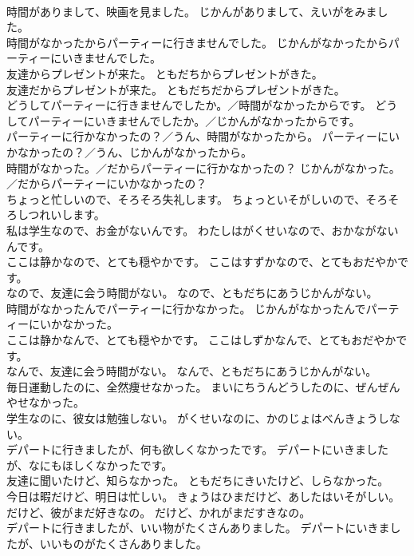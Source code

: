 \documentclass[8pt]{extreport}
\begin{document}
\begin{CJK}{UTF8}{min}
\\	時間がありまして、映画を見ました。	じかんがありまして、えいがをみました。 
\\	時間がなかったからパーティーに行きませんでした。	じかんがなかったからパーティーにいきませんでした。 
\\	友達からプレゼントが来た。	ともだちからプレゼントがきた。 
\\	友達だからプレゼントが来た。	ともだちだからプレゼントがきた。 
\\	どうしてパーティーに行きませんでしたか。／時間がなかったからです。	どうしてパーティーにいきませんでしたか。／じかんがなかったからです。 
\\	パーティーに行かなかったの？／うん、時間がなかったから。	パーティーにいかなかったの？／うん、じかんがなかったから。 
\\	時間がなかった。／だからパーティーに行かなかったの？	じかんがなかった。／だからパーティーにいかなかったの？ 
\\	ちょっと忙しいので、そろそろ失礼します。	ちょっといそがしいので、そろそろしつれいします。 
\\	私は学生なので、お金がないんです。	わたしはがくせいなので、おかながないんです。 
\\	ここは静かなので、とても穏やかです。	ここはすずかなので、とてもおだやかです。 
\\	なので、友達に会う時間がない。	なので、ともだちにあうじかんがない。 
\\	時間がなかったんでパーティーに行かなかった。	じかんがなかったんでパーティーにいかなかった。 
\\	ここは静かなんで、とても穏やかです。	ここはしずかなんで、とてもおだやかです。 
\\	なんで、友達に会う時間がない。	なんで、ともだちにあうじかんがない。 
\\	毎日運動したのに、全然痩せなかった。	まいにちうんどうしたのに、ぜんぜんやせなかった。 
\\	学生なのに、彼女は勉強しない。	がくせいなのに、かのじょはべんきょうしない。 
\\	デパートに行きましたが、何も欲しくなかったです。	デパートにいきましたが、なにもほしくなかったです。 
\\	友達に聞いたけど、知らなかった。	ともだちにきいたけど、しらなかった。 
\\	今日は暇だけど、明日は忙しい。	きょうはひまだけど、あしたはいそがしい。 
\\	だけど、彼がまだ好きなの。	だけど、かれがまだすきなの。 
\\	デパートに行きましたが、いい物がたくさんありました。	デパートにいきましたが、いいものがたくさんありました。 

\end{CJK}
\end{document}
